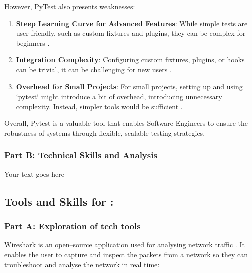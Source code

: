 \documentclass[a4paper, 11pt]{report}
\begin{document}
However, PyTest also presents weaknesses:

\begin{enumerate}
    \item \textbf{Steep Learning Curve for Advanced Features}: While simple tests are user-friendly, such as custom fixtures and plugins, they can be complex for beginners \cite{sharma2024}.
    \item \textbf{Integration Complexity}: Configuring custom fixtures, plugins, or hooks can be trivial, it can be challenging for new users \cite{sharma2024}.
    \item \textbf{Overhead for Small Projects}: For small projects, setting up and using `pytest` might introduce a bit of overhead, introducing unnecessary complexity. Instead, simpler tools would be sufficient \cite{sharma2024}.
\end{enumerate}

Overall, Pytest is a valuable tool that enables Software Engineers to ensure the robustness of systems through flexible, scalable testing strategies.


\subsubsection{Part B: Technical Skills and Analysis}

Your text goes here




\subsection{Tools and Skills for \majD: \studD}

\subsubsection{Part A: Exploration of tech tools}

Wireshark is an open–source application used for analysing network traffic \cite{soepeno2023}. It enables the user to capture and inspect the packets from a network so they can troubleshoot and analyse the network in real time:
\end{document}
